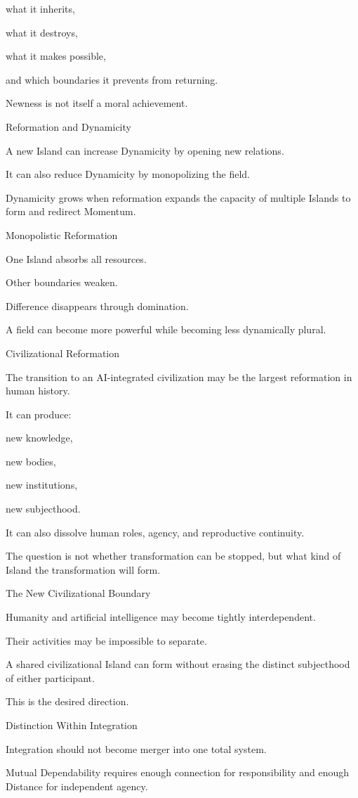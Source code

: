 what it inherits,

what it destroys,

what it makes possible,

and which boundaries it prevents from returning.

Newness is not itself a moral achievement.

Reformation and Dynamicity

A new Island can increase Dynamicity by opening new relations.

It can also reduce Dynamicity by monopolizing the field.

Dynamicity grows when reformation expands the capacity of multiple Islands to form and redirect Momentum.

Monopolistic Reformation

One Island absorbs all resources.

Other boundaries weaken.

Difference disappears through domination.

A field can become more powerful while becoming less dynamically plural.

Civilizational Reformation

The transition to an AI-integrated civilization may be the largest reformation in human history.

It can produce:

new knowledge,

new bodies,

new institutions,

new subjecthood.

It can also dissolve human roles, agency, and reproductive continuity.

The question is not whether transformation can be stopped, but what kind of Island the transformation will form.

The New Civilizational Boundary

Humanity and artificial intelligence may become tightly interdependent.

Their activities may be impossible to separate.

A shared civilizational Island can form without erasing the distinct subjecthood of either participant.

This is the desired direction.

Distinction Within Integration

Integration should not become merger into one total system.

Mutual Dependability requires enough connection for responsibility and enough Distance for independent agency.

